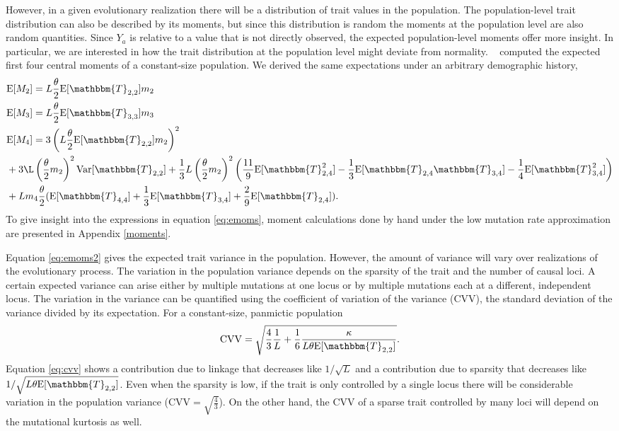 However, in a given evolutionary realization there will be a distribution of
trait values in the population. The population-level trait distribution can also
be described by its moments, but since this distribution is random the moments
at the population level are also random quantities. Since $Y_a$ is relative to a
value that is not directly observed, the expected population-level moments offer
more insight. In particular, we are interested in how the trait distribution at
the population level might deviate from normality. ~\citet{Schraiber2015}
computed the expected first four central moments of a constant-size population.
We derived the same expectations under an arbitrary demographic history,
\begin{subequations} \label{eq:emoms}
\begin{align}
  &\E[M_2] = L \T \E[\mathbbm{T}_{2,2}] m_2 \label{eq:emoms2}\\
  &\E[M_3] = L \T \E[\mathbbm{T}_{3,3}] m_3  \label{eq:emoms3}\\
  &\E[M_4] = 3\left(L \T \E[\mathbbm{T}_{2,2}] m_2\right)^2 \nonumber \\
  &+ 3\L \left(\T m_2\right)^2\Var[\mathbbm{T}_{2,2}] + \frac{1}{3}
  L \left(\T m_2\right)^2
    \left( \frac{11}{9} \E[\mathbbm{T}_{2,4}^2]-\frac{1}{3}\E[\mathbbm{T}_{2,4}\mathbbm{T}_{3,4}]-
    \frac{1}{4}\E[\mathbbm{T}_{3,4}^2]\right) \nonumber \\
  &+ L m_4 \T ( \E[\mathbbm{T}_{4,4}] + \frac{1}{3} \E[\mathbbm{T}_{3,4}] +
    \frac{2}{9} \E[\mathbbm{T}_{2,4}] ).
  \label{eq:emoms4}
\end{align}
\end{subequations}
To give insight into the expressions in equation \eqref{eq:emoms}, moment
calculations done by hand under the low mutation rate approximation are
presented in Appendix \ref{moments}.

Equation \eqref{eq:emoms2} gives the expected trait variance in the population.
However, the amount of variance will vary over realizations of the evolutionary
process. The variation in the population variance depends on the sparsity of the
trait and the number of causal loci. A certain expected variance can arise
either by multiple mutations at one locus or by multiple mutations each at a
different, independent locus. The variation in the variance can be quantified
using the coefficient of variation of the variance (CVV), the standard deviation
of the variance divided by its expectation. For a constant-size, panmictic
population
\begin{equation}
  \label{eq:cvv}
  \mathrm{CVV} = \sqrt{\frac{4}{3}\frac{1}{L} +
    \frac{1}{6}\frac{\kappa}{L\theta \E[\mathbbm{T}_{2,2}]}}.
\end{equation}
Equation \eqref{eq:cvv} shows a contribution due to linkage that decreases like
$1/\sqrt{L}$ and a contribution due to sparsity that decreases like
$1/\sqrt{L\theta \E[\mathbbm{T}_{2,2}]}$. Even when the sparsity is low, if the
trait is only controlled by a single locus there will be considerable variation
in the population variance (CVV$=\sqrt{\frac{4}{3}}$). On the other hand, the
CVV of a sparse trait controlled by many loci will depend on the mutational
kurtosis as well.
